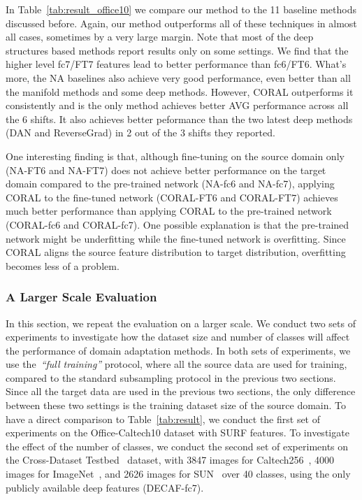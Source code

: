 \documentclass[letterpaper]{article}
\begin{document}
In Table~\ref{tab:result_office10} we compare our method to the 11 baseline methods discussed before. Again, our method outperforms all of these techniques in almost all cases, sometimes by a very large margin. Note that most of the deep structures based methods report results only on some settings. We find that the higher level fc7/FT7 features lead to better performance than fc6/FT6. What's more, the NA baselines also achieve very good performance, even better than all the manifold methods and some deep methods. However, CORAL outperforms it consistently and is the only method achieves better AVG performance across all the 6 shifts. It also achieves better peformance than the two latest deep methods (DAN and ReverseGrad) in 2 out of the 3 shifts they reported.

One interesting finding is that, although fine-tuning on the source domain only (NA-FT6 and NA-FT7) does not achieve better performance on the target domain compared to the pre-trained network (NA-fc6 and NA-fc7), applying CORAL to the fine-tuned network (CORAL-FT6 and CORAL-FT7) achieves much better performance than applying CORAL to the pre-trained network (CORAL-fc6 and CORAL-fc7). One possible explanation is that the pre-trained network might be underfitting while the fine-tuned network is overfitting. Since CORAL aligns the source feature distribution to target distribution, overfitting becomes less of a problem. 

\subsubsection{A Larger Scale Evaluation}
\label{subsubsec:larger}
In this section, we repeat the evaluation on a larger scale. We conduct two sets of experiments to investigate how the dataset size and number of classes will affect the performance of domain adaptation methods. In both sets of experiments, we use the~\emph{``full training''} protocol, where all the source data are used for training, compared to the standard subsampling protocol in the previous two sections. Since all the target data are used in the previous two sections, the only difference between these two settings is the training dataset size of the source domain. To have a direct comparison to Table~\ref{tab:result}, we conduct the first set of experiments on the Office-Caltech10 dataset with SURF features. To investigate the effect of the number of classes, we conduct the second set of experiments on the Cross-Dataset Testbed~\cite{cross_dataset} dataset, with 3847 images for Caltech256~\cite{caltech256}, 4000 images for ImageNet~\cite{imagenet}, and 2626 images for SUN~\cite{sun_data} over 40 classes, using the only publicly available deep features (DECAF-fc7). 
\end{document}
